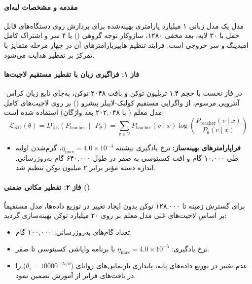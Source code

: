 \item {}

\paragraph*{مقدمه و مشخصات لبه‌ای}
مدل  \cite{huber2025mobilellmpro} یک مدل زبانی ۱ میلیارد پارامتری بهینه‌شده برای پردازش روی دستگاه‌های قابل حمل با ۳۰ لایه، بعد مخفی ۱۲۸۰، سازوکار توجه گروهی () با ۴ سر  و اشتراک کامل امبدینگ و سر خروجی است. فرایند تنظیم هایپرپارامترهای آن در چهار مرحله متمایز با تمرکز بر تقطیر هدایت می‌شود.

\paragraph*{فاز ۱: فراگیری زبان با تقطیر مستقیم لاجیت‌ها}
در فاز نخست با حجم ۱.۴ تریلیون توکن و بافت ۲۰۴۸ توکن، به‌جای تابع زیان کراس-آنتروپی مرسوم، از واگرایی مستقیم کولبک-لایبلر پیشرو () بر روی لاجیت‌های کامل مدل معلم ( با ۲۰۲,۰۴۸ بعد واژگان) استفاده شده است:
\begin{equation}
    \mathcal{L}_{\text{KD}}(\theta) = D_{\text{KL}}\left(P_{\text{teacher}} \,\|\, P_{\theta}\right) = \sum_{v \in \mathcal{V}} P_{\text{teacher}}(v \mid x) \log\left(\frac{P_{\text{teacher}}(v \mid x)}{P_\theta(v \mid x)}\right)
\end{equation}
\begin{itemize}
    \item \textbf{فراپارامترهای بهینه‌ساز:} نرخ یادگیری بیشینه $\eta_{\text{max}} = 4.0 \times 10^{-4}$، گرم‌شدن اولیه طی ۱۰,۰۰۰ گام و افت کسینوسی به صفر در طول ۶۴۰,۰۰۰ گام به‌روزرسانی. اندازه دسته مؤثر برابر ۲ میلیون توکن تنظیم شد.
\end{itemize}

\paragraph*{فاز ۲: تقطیر مکانی ضمنی ()}
برای گسترش زمینه تا ۱۲۸,۰۰۰ توکن بدون ایجاد تغییر در توزیع داده‌ها، مدل مستقیماً بر اساس لاجیت‌های غنی مدل معلم بر روی ۲۰ میلیارد توکن بهینه‌سازی گردید:
\begin{itemize}
    \item تعداد گام‌های به‌روزرسانی: ۱۰۰,۰۰۰ گام.
    \item نرخ یادگیری: $\eta_{\text{max}} = 4.0 \times 10^{-5}$ با برنامه واپاشی کسینوسی تا صفر.
    \item عدم تغییر در توزیع داده‌های پایه، پایداری بازنمایی‌های زوایای  ($\theta_i = 10000^{-2i/d}$) را در بافت‌های فراتر از آموزش تضمین نمود.
\end{itemize}

